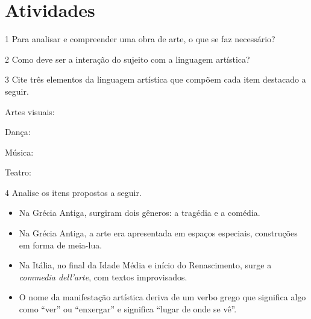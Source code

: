 \section{Atividades}

\num{1}  Para analisar e compreender uma obra de arte, o que se faz necessário?


\num{2} Como deve ser a interação do sujeito com a linguagem artística?


\num{3}  Cite três elementos da linguagem artística que compõem cada item destacado a seguir.

\begin{escolha}
\item
  Artes visuais: 

\item
  Dança: 

\item
  Música: 

\item
  Teatro: 
\end{escolha}

\num{4} Analise os itens propostos a seguir.

\begin{itemize}
  \item Na Grécia Antiga, surgiram dois gêneros: a tragédia e a comédia.
  \item Na Grécia Antiga, a arte era apresentada em espaços especiais,
construções em forma de meia-lua.
  \item Na Itália, no final da Idade Média e início do Renascimento, surge a
\textit{commedia dell'arte}, com textos improvisados.
  \item O nome da manifestação artística deriva de um verbo grego que significa algo como ``ver'' ou ``enxergar'' e significa ``lugar de onde se vê''.
\end{itemize}


